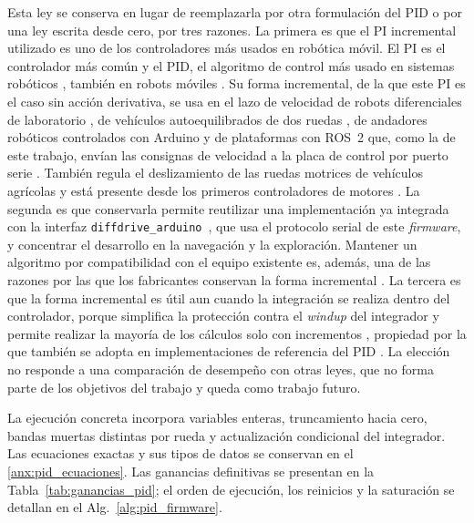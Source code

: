 Esta ley se conserva en lugar de reemplazarla por otra formulación del PID o
por una ley escrita desde cero, por tres razones. La primera es que el PI
incremental utilizado es uno de los controladores más usados en robótica móvil.
El PI es el controlador más común
\citep[Sec.~3.6]{astrom2009controlpid} y el PID, el algoritmo de control más
usado en sistemas robóticos \citep{raj2024discussion}, también en robots móviles
\citep{bitria2022optimal}. Su forma incremental, de la que este PI es el caso
sin acción derivativa, se usa en el lazo de velocidad de robots diferenciales de
laboratorio \citep{casini2010remote}, de vehículos autoequilibrados de dos
ruedas \citep{ma2024selfbalancing}, de andadores robóticos controlados con
Arduino \citep{mori2024walker} y de plataformas con ROS~2 que, como la de este
trabajo, envían las consignas de velocidad a la placa de control por puerto serie
\citep{wu2026ros2}. También regula el deslizamiento de las ruedas motrices de
vehículos agrícolas \citep{sun2022travel} y está presente desde los primeros
controladores de motores \citep[Sec.~13.4]{astrom2009controlpid}. La segunda es
que conservarla permite reutilizar una implementación ya integrada con la
interfaz \texttt{diffdrive\_arduino}~\citep{newans_diffdrive}, que usa el
protocolo serial de este \textit{firmware}, y concentrar el desarrollo en la
navegación y la exploración. Mantener un algoritmo por compatibilidad con el
equipo existente es, además, una de las razones por las que los fabricantes
conservan la forma incremental \citep[Sec.~13.4]{astrom2009controlpid}. La
tercera es que la forma incremental es útil aun cuando la integración se realiza
dentro del controlador, porque simplifica la protección contra el
\textit{windup} del integrador y permite realizar la mayoría de los cálculos
solo con incrementos \citep[Secs.~13.1 y 13.4]{astrom2009controlpid}, propiedad
por la que también se adopta en implementaciones de referencia del PID
\citep{sundstrom2024reference}. La elección no responde a una
comparación de desempeño con otras leyes, que no forma parte de los objetivos
del trabajo y queda como trabajo futuro.

La ejecución concreta incorpora variables enteras, truncamiento hacia cero,
bandas muertas distintas por rueda y actualización condicional del integrador.
Las ecuaciones exactas y sus tipos de datos se conservan en el
\ref{anx:pid_ecuaciones}. Las
ganancias definitivas se presentan en la Tabla~\ref{tab:ganancias_pid}; el orden
de ejecución, los reinicios y la saturación se detallan en el
Alg.~\ref{alg:pid_firmware}.

